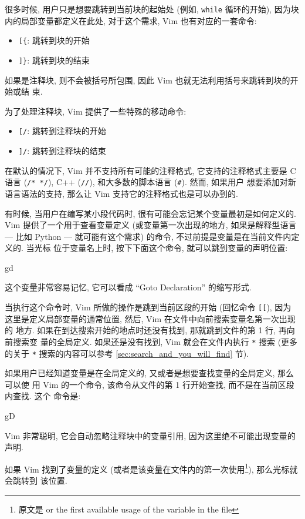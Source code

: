 很多时候, 用户只是想要跳转到当前块的起始处 (例如, \texttt{while} 循环的开始),
因为块内的局部变量都定义在此处, 对于这个需求, Vim 也有对应的一套命令:
\begin{itemize}
    \item \verb'[{': 跳转到块的开始
    \item \verb']}': 跳转到块的结束
\end{itemize}

如果是注释块, 则不会被括号所包围, 因此 Vim 也就无法利用括号来跳转到块的开始或结
束.

为了处理注释块, Vim 提供了一些特殊的移动命令:
\begin{itemize}
    \item \verb'[/': 跳转到注释块的开始
    \item \verb']/': 跳转到注释块的结束
\end{itemize}

在默认的情况下, Vim 并不支持所有可能的注释格式, 它支持的注释格式主要是 C 语言 
(\verb'/* */'), C++ (\verb'//'), 和大多数的脚本语言 (\verb'#'). 然而, 如果用户 
想要添加对新语言语法的支持, 那么让 Vim 支持它的注释格式也是可以办到的.

有时候, 当用户在编写某小段代码时, 很有可能会忘记某个变量最初是如何定义的. Vim 
提供了一个用于查看变量定义 (或变量第一次出现的地方, 如果是解释型语言 --- 比如
Python --- 就可能有这个需求) 的命令, 不过前提是变量是在当前文件内定义的. 当光标
位于变量名上时, 按下下面这个命令, 就可以跳到变量的声明位置:
\begin{vimcmd}
gd
\end{vimcmd}
这个变量非常容易记忆, 它可以看成 ``Goto Declaration'' 的缩写形式.

当执行这个命令时, Vim 所做的操作是跳到当前区段的开始 (回忆命令 \verb'[['), 因为
这里是定义局部变量的通常位置, 然后, Vim 在文件中向前搜索变量名第一次出现的
地方. 如果在到达搜索开始的地点时还没有找到, 那就跳到文件的第 1 行, 再向前搜索变
量的全局定义. 如果还是没有找到, Vim 就会在文件内执行 \verb'*' 搜索 (更多的关于
\verb'*' 搜索的内容可以参考 \ref{sec:search_and_you_will_find} 节).

如果用户已经知道变量是在全局定义的, 又或者是想要查找变量的全局定义, 那么可以使
用 Vim 的一个命令, 该命令从文件的第 1 行开始查找, 而不是在当前区段内查找. 这个 
命令是:
\begin{vimcmd}
gD
\end{vimcmd}
Vim 非常聪明, 它会自动忽略注释块中的变量引用, 因为这里绝不可能出现变量的声明.

如果 Vim 找到了变量的定义 (或者是该变量在文件内的第一次使用\footnote{原文是 
or the first available usage of the variable in the file}), 那么光标就会跳转到
该位置.

